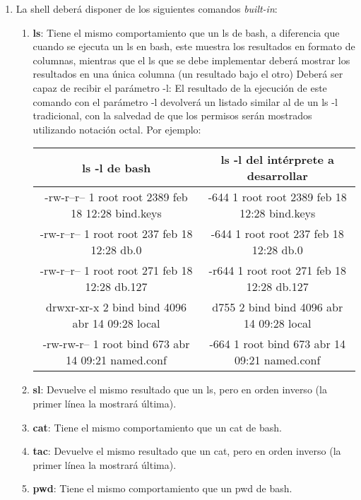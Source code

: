 \begin{enumerate}
\begin{enumerate}
	    \item La shell deberá disponer de los siguientes comandos \textit{built-in}:
	    \begin{enumerate}
	     \item \textbf{ls}: Tiene el mismo comportamiento que un ls de bash, a diferencia que cuando se ejecuta un ls en bash, este muestra los resultados en formato de columnas, mientras que el ls que se debe implementar deberá mostrar los resultados en una única columna (un resultado bajo el otro) Deberá ser capaz de recibir el parámetro -l: El resultado de la ejecución de este comando con el parámetro -l devolverá un listado similar al de un ls -l tradicional, con la salvedad de que los permisos serán mostrados utilizando notación octal. Por ejemplo:
	     \begin{table}[th]
		    \centering
		    \begin{tabular}{| c | c |}
			    \hline
			    \bf ls -l de bash & \bf ls -l del intérprete a desarrollar \\
			    \hline
			    -rw-r--r-- 1 root root 2389 feb 18 12:28 bind.keys & -644 1 root root 2389 feb 18 12:28 bind.keys \\ 
			    \hline
			    -rw-r--r-- 1 root root 237 feb 18 12:28 db.0 & -644 1 root root 237 feb 18 12:28 db.0 \\
			    \hline
			    -rw-r--r-- 1 root root 271 feb 18 12:28 db.127 & -r644 1 root root 271 feb 18 12:28 db.127 \\
			    \hline
			    drwxr-xr-x 2 bind bind 4096 abr 14 09:28 local & d755 2 bind bind 4096 abr 14 09:28 local \\
			    \hline
			    -rw-rw-r-- 1 root bind 673 abr 14 09:21 named.conf & -664 1 root bind 673 abr 14 09:21 named.conf \\
			    \hline
		    \end{tabular}
	     \end{table}
	     
	     \item \textbf{sl}: Devuelve el mismo resultado que un ls, pero en orden inverso (la primer línea la mostrará última).

	     \item \textbf{cat}: Tiene el mismo comportamiento que un cat de bash.

	     \item \textbf{tac}: Devuelve el mismo resultado que un cat, pero en orden inverso (la primer línea la mostrará última).
	     
	     \item \textbf{pwd}: Tiene el mismo comportamiento que un pwd de bash.
	     

\end{enumerate}
\end{enumerate}
\end{enumerate}
